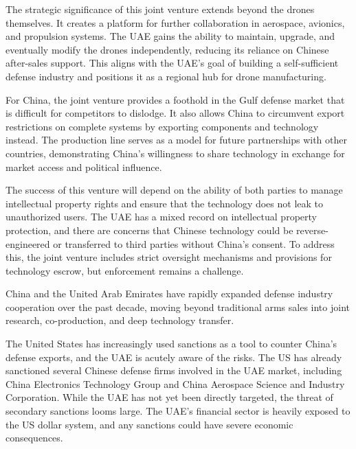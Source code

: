 \documentclass[10pt,a4paper]{article}
\begin{document}
{\small The strategic significance of this joint venture extends beyond the drones themselves. It creates a platform for further collaboration in aerospace, avionics, and propulsion systems. The UAE gains the ability to maintain, upgrade, and eventually modify the drones independently, reducing its reliance on Chinese after-sales support. This aligns with the UAE's goal of building a self-sufficient defense industry and positions it as a regional hub for drone manufacturing.}\par
{\small For China, the joint venture provides a foothold in the Gulf defense market that is difficult for competitors to dislodge. It also allows China to circumvent export restrictions on complete systems by exporting components and technology instead. The production line serves as a model for future partnerships with other countries, demonstrating China's willingness to share technology in exchange for market access and political influence.}\par
{\small The success of this venture will depend on the ability of both parties to manage intellectual property rights and ensure that the technology does not leak to unauthorized users. The UAE has a mixed record on intellectual property protection, and there are concerns that Chinese technology could be reverse-engineered or transferred to third parties without China's consent. To address this, the joint venture includes strict oversight mechanisms and provisions for technology escrow, but enforcement remains a challenge.}\par
{\small China and the United Arab Emirates have rapidly expanded defense industry cooperation over the past decade, moving beyond traditional arms sales into joint research, co-production, and deep technology transfer.}\par
{}\par\vspace{1pt}
{\small The United States has increasingly used sanctions as a tool to counter China's defense exports, and the UAE is acutely aware of the risks. The US has already sanctioned several Chinese defense firms involved in the UAE market, including China Electronics Technology Group and China Aerospace Science and Industry Corporation. While the UAE has not yet been directly targeted, the threat of secondary sanctions looms large. The UAE's financial sector is heavily exposed to the US dollar system, and any sanctions could have severe economic consequences.}\par
\end{document}
